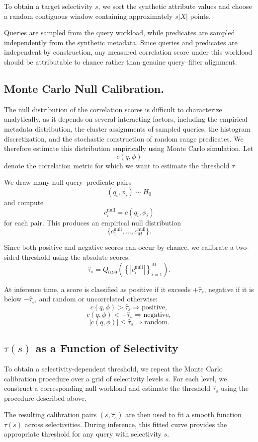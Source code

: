 To obtain a target selectivity \(s\), we sort the synthetic attribute values and choose a random contiguous window containing approximately \(s|X|\) points.

Queries are sampled from the query workload, while predicates are sampled independently from the synthetic metadata. Since queries and predicates are independent by construction, any measured correlation score under this workload should be attributable to chance rather than genuine query--filter alignment.

\subsection{Monte Carlo Null Calibration.}
The null distribution of the correlation scores is difficult to characterize analytically, as it depends on several interacting factors, including the empirical metadata distribution, the cluster assignments of sampled queries, the histogram discretization, and the stochastic construction of random range predicates. We therefore estimate this distribution empirically using Monte Carlo simulation.
Let 
\[
c(q,\phi)
\]
denote the correlation metric for which we want to estimate the threshold $\tau$

We draw many null query--predicate pairs
\[
(q_i,\phi_i) \sim H_0
\]
and compute
\[
c_i^{\mathrm{null}} = c(q_i,\phi_i)
\]
for each pair. This produces an empirical null distribution
\[
\{c_1^{\mathrm{null}},\dots,c_M^{\mathrm{null}}\}.
\]

Since both positive and negative scores can occur by chance, we calibrate a
two-sided threshold using the absolute scores:
\[
\hat{\tau}_s
=
Q_{0.99}
\left(
\left\{
|c_i^{\mathrm{null}}|
\right\}_{i=1}^M
\right).
\]

At inference time, a score is classified as positive if it exceeds
\(+\hat{\tau}_s\), negative if it is below \(-\hat{\tau}_s\), and random or
uncorrelated otherwise:
\[
c(q,\phi) >
\hat{\tau}_s
\Rightarrow \text{positive},
\]
\[
c(q,\phi) <
-\hat{\tau}_s
\Rightarrow \text{negative},
\]
\[
|c(q,\phi)| \le \hat{\tau}_s
\Rightarrow \text{random}.
\]

\subsection{$\tau(s)$ as a Function of Selectivity}
To obtain a selectivity-dependent threshold, we repeat the Monte Carlo calibration procedure over a grid of selectivity levels \(s\). For each level, we construct a corresponding null workload and estimate the threshold \(\hat{\tau}_s\) using the procedure described above.

The resulting calibration pairs \((s,\hat{\tau}_s)\) are then used to fit a smooth function \(\tau(s)\) across selectivities. During inference, this fitted curve provides the appropriate threshold for any query with selectivity \(s\).